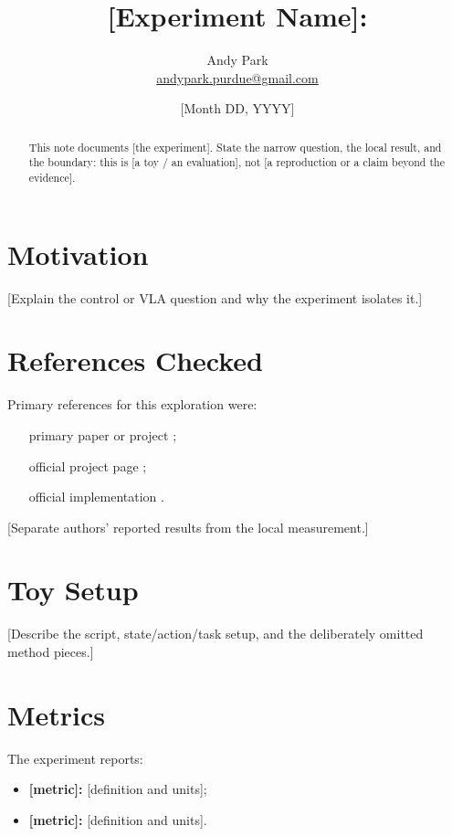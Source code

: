 \documentclass[11pt]{article}
\title{[Experiment Name]:\\[A Short, Specific Toy-Benchmark Subtitle]}
\author{Andy Park\\\href{mailto:andypark.purdue@gmail.com}{andypark.purdue@gmail.com}}
\date{[Month DD, YYYY]}
\begin{document}
\maketitle

\begin{abstract}
This note documents [the experiment]. State the narrow question, the local result, and the boundary: this is [a toy / an evaluation], not [a reproduction or a claim beyond the evidence].
\end{abstract}

\section{Motivation}

[Explain the control or VLA question and why the experiment isolates it.]

\section{References Checked}

Primary references for this exploration were:
\begin{itemize}[leftmargin=1.5em]
  \item [primary paper or project] \cite{primary};
  \item [official project page] \cite{project};
  \item [official implementation] \cite{code}.
\end{itemize}

[Separate authors' reported results from the local measurement.]

\section{Toy Setup}

[Describe the script, state/action/task setup, and the deliberately omitted method pieces.]

\section{Metrics}

The experiment reports:
\begin{itemize}[leftmargin=1.5em]
  \item \textbf{[metric]:} [definition and units];
  \item \textbf{[metric]:} [definition and units].
\end{itemize}
\end{document}
